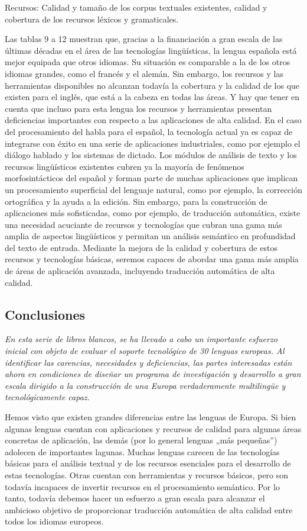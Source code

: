 \begin{multicols}{2}
Recursos: Calidad y tamaño de los corpus textuales existentes, calidad y cobertura de los recursos léxicos y gramaticales.

Las tablas 9 a 12 muestran que, gracias a la financiación a gran escala de las últimas décadas en el área de las tecnologías lingüísticas, la lengua española está mejor equipada que otros idiomas. Su situación es comparable a la de los otros idiomas  grandes, como el francés y el alemán. Sin embargo, los recursos y las herramientas disponibles no alcanzan todavía la cobertura y la calidad de los que existen para el inglés, que está a la cabeza en todas las áreas. Y hay que tener en cuenta que  incluso para esta lengua los recursos y herramientas presentan deficiencias importantes con respecto a las aplicaciones de alta calidad.
En el caso del procesamiento del habla para el español, la tecnología actual ya es capaz de integrarse con éxito en una serie de aplicaciones industriales, como por ejemplo el diálogo hablado y los sistemas de dictado. Los módulos de análisis de texto y los recursos lingüísticos existentes cubren ya la mayoría de fenómenos morfosintácticos del español y forman parte de muchas aplicaciones que implican un procesamiento superficial del lenguaje natural, como por ejemplo, la corrección ortográfica y la ayuda a la edición.
Sin embargo, para la construcción de aplicaciones más sofisticadas, como por ejemplo, de traducción automática, existe una necesidad acuciante de recursos y tecnologías que cubran una gama más amplia de aspectos lingüísticos y permitan un análisis semántico en profundidad del texto de entrada. Mediante la mejora de la calidad y cobertura de estos recursos y tecnologías básicas, seremos capaces de abordar una gama más amplia de áreas de aplicación avanzada, incluyendo traducción automática de alta calidad.

\subsection{Conclusiones}

\emph{En esta serie de libros blancos, se ha llevado a cabo un importante esfuerzo inicial con objeto de evaluar el soporte tecnológico de 30 lenguas europeas. Al identificar las carencias, necesidades y deficiencias, las partes interesadas están ahora en condiciones de diseñar un programa de investigación y desarrollo a gran escala dirigido a la construcción de una Europa verdaderamente multilingüe y tecnológicamente capaz.}

Hemos visto que existen grandes diferencias entre las lenguas de Europa. Si bien algunas lenguas cuentan con aplicaciones y recursos de calidad para algunas áreas concretas de aplicación, las demás (por lo general lenguas „más pequeñas”) adolecen de importantes lagunas. Muchas lenguas carecen de las tecnologías básicas para el análisis textual y de los recursos esenciales para el desarrollo de estas tecnologías. Otras cuentan con herramientas y recursos básicos, pero son todavía incapaces de invertir recursos en el procesamiento semántico. Por lo tanto, todavía debemos hacer un esfuerzo a gran escala para alcanzar el ambicioso objetivo de proporcionar traducción automática de alta calidad entre todos los idiomas europeos.


\end{multicols}

